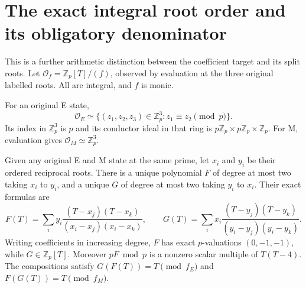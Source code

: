\section{The exact integral root order and its obligatory denominator}
This is a further arithmetic distinction between the coefficient target and its
split roots. Let $\mathcal O_f=\mathbb Z_p[T]/(f)$, observed by evaluation at the
three original labelled roots. All are integral, and $f$ is monic.

\begin{theorem}
For an original E state,
\[
 \boxed{\mathcal O_E\simeq
 \{(z_1,z_2,z_3)\in\mathbb Z_p^3:z_1\equiv z_2\pmod p\}.}       \tag{15a}
\]
Its index in $\mathbb Z_p^3$ is $p$ and its conductor ideal in that ring is
$p\mathbb Z_p\times p\mathbb Z_p\times\mathbb Z_p$.
For M, evaluation gives $\mathcal O_M\simeq\mathbb Z_p^3$.

Given any original E and M state at the same prime, let $x_i$ and $y_i$ be their
ordered reciprocal roots. There is a unique polynomial $F$ of degree at most
two taking $x_i$ to $y_i$, and a unique $G$ of degree at most two taking $y_i$
to $x_i$. Their exact formulas are
\[
 F(T)=\sum_i y_i\frac{(T-x_j)(T-x_k)}{(x_i-x_j)(x_i-x_k)},\qquad
 G(T)=\sum_i x_i\frac{(T-y_j)(T-y_k)}{(y_i-y_j)(y_i-y_k)}.       \tag{15b}
\]
Writing coefficients in increasing degree, $F$ has exact $p$-valuations
$(0,-1,-1)$, while $G\in\mathbb Z_p[T]$.
Moreover $pF\bmod p$ is a nonzero scalar multiple of $T(T-4)$.
The compositions satisfy $G(F(T))=T\pmod{f_E}$ and
$F(G(T))=T\pmod{f_M}$.
\end{theorem}
